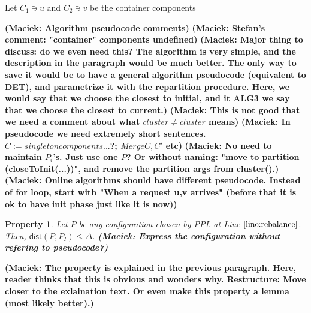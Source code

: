 \documentclass[a4paper,anonymous,USenglish]{lipics-v2019}
\newcommand{\PPL}{\textsf{PPL}\xspace}
\newcommand{\dist}{\textsf{dist}}
\newtheorem{property}{Property}
\DeclarePairedDelimiter\set{\{}{\}}
\newcommand\maciek[1]{\color{brown}\textbf{(Maciek: #1)}\color{black}}
\begin{document}
\label{alg:PPL}
\begin{algorithm}
	\renewcommand{\algorithmicrequire}{\textbf{Input:}}
	\renewcommand{\algorithmicensure}{\textbf{Output:}}
	\begin{algorithmic}
		\label{line:initcomponents}
		\STATE Let $C_1 \ni u$ and $C_2 \ni v$ be the container components
		 \label{line:mergecomponents}
		\label{line:rebalance} 
		\ENDIF
		\ENDIF
		\ENDFOR
	\end{algorithmic}
	\caption{Perfect Partition Learner (\PPL)}
	\label{alg:ppl}
\end{algorithm}


\maciek{Algorithm pseudocode comments}
\maciek{Stefan's comment: "container" components undefined}
\maciek{Major thing to discuss: do we even need this? The algorithm is very simple, and the description in the paragraph would be much better. The only way to save it would be to have a general algorithm pseudocode (equivalent to DET), and parametrize it with the repartition procedure. Here, we would say that we choose the closest to initial, and it ALG3 we say that we choose the closest to current.}
\maciek{This is not good that we need a comment about what $cluster \neq cluster$ means}
\maciek{In pseudocode we need extremely short sentences. $C := singleton components ... $?; $Merge C, C'$ etc}
\maciek{No need to maintain $P_i$'s. Just use one $P$? Or without naming: "move to partition (closeToInit(...))", and remove the partition args from cluster().}
\maciek{Online algorithms should have different pseudocode. Instead of for loop, start with "When a request u,v arrives" (before that it is ok to have init phase just like it is now)}

\begin{property} \label{prop:dist<OPT}
	Let $P$ be any configuration chosen by \PPL at Line $\ref{line:rebalance}$.
	Then, $\dist(P,P_I) \leq \Delta$.
	\maciek{Express the configuration without refering to pseudocode?}
\end{property}
\maciek{The property is explained in the previous paragraph. Here, reader thinks that this is obvious and wonders why. Restructure: Move closer to the exlaination text. Or even make this property a lemma (most likely better).}
\end{document}
